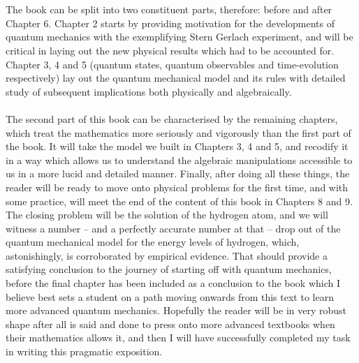 \\\\
The book can be split into two constituent parts, therefore: before and after Chapter 6. Chapter 2 starts by providing motivation for the developments of quantum mechanics with the exemplifying Stern Gerlach experiment, and will be critical in laying out the new physical results which had to be accounted for. Chapter 3, 4 and 5 (quantum states, quantum observables and time-evolution respectively) lay out the quantum mechanical model and its rules with detailed study of subsequent implications both physically and algebraically. 
\\\\
The second part of this book can be characterised by the remaining chapters, which treat the mathematics more seriously and vigorously than the first part of the book. It will take the model we built in Chapters 3, 4 and 5, and recodify it in a way which allows us to understand the algebraic manipulations accessible to us in a more lucid and detailed manner. Finally, after doing all these things, the reader will be ready to move onto physical problems for the first time, and with some practice, will meet the end of the content of this book in Chapters 8 and 9. The closing problem will be the solution of the hydrogen atom, and we will witness a number -- and a perfectly accurate number at that -- drop out of the quantum mechanical model for the energy levels of hydrogen, which, astonishingly, is corroborated by empirical evidence. That should provide a satisfying conclusion to the journey of starting off with quantum mechanics, before the final chapter has been included as a conclusion to the book which I believe best sets a student on a path moving onwards from this text to learn more advanced quantum mechanics.  Hopefully the reader will be in very robust shape after all is said and done to press onto more advanced textbooks when their mathematics allows it, and then I will have successfully completed my task in writing this pragmatic exposition.

\tableofcontents
